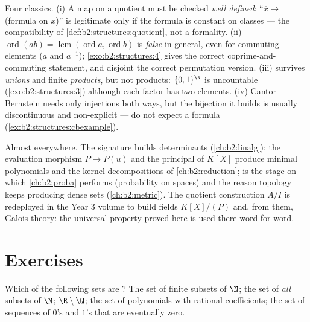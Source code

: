 \begin{remark}\label{rem:b2:structures:pitfalls}
Four classics. (i) A map on a quotient must be checked
\emph{well defined}: ``$\overline x \mapsto$ (formula on $x$)''
is legitimate only if the formula is constant on classes ---
the compatibility of \cref{def:b2:structures:quotient}, not a
formality. (ii) $\operatorname{ord}(ab) =
\operatorname{lcm}(\operatorname{ord}a, \operatorname{ord}b)$
is \emph{false} in general, even for commuting elements ($a$
and $a^{-1}$); \cref{exo:b2:structures:4} gives the correct
coprime-and-commuting statement, and disjoint  the
correct permutation version. (iii)  survives
 \emph{unions} and finite \emph{products}, but not
 products: $\{0,1\}^{\N}$ is uncountable
(\cref{exo:b2:structures:3}) although each factor has two
elements. (iv) Cantor--Bernstein needs only injections both
ways, but the bijection it builds is usually discontinuous and
non-explicit --- do not expect a formula
(\cref{ex:b2:structures:cbexample}).
\end{remark}

\begin{remark}
Almost everywhere. The signature builds determinants
(\cref{ch:b2:linalg}); the evaluation morphism $P \mapsto P(u)$
and the principal  of $K[X]$ produce minimal polynomials and
the kernel decompositions of \cref{ch:b2:reduction}; 
is the stage on which \cref{ch:b2:proba} performs (probability on
 spaces) and the reason topology keeps producing 
dense sets (\cref{ch:b2:metric}). The quotient construction $A/I$
is redeployed in the Year 3 volume to build fields $K[X]/(P)$ and,
from them, Galois theory: the universal property proved here is
used there word for word.
\end{remark}

\section{Exercises}

\begin{exercise}[$\star$]\label{exo:b2:structures:1}
Which of the following sets are ? The set of finite subsets
of $\N$; the set of \emph{all} subsets of $\N$; $\R \setminus \Q$;
the set of polynomials with rational coefficients; the set of
sequences of $0$'s and $1$'s that are eventually zero.
\end{exercise}

